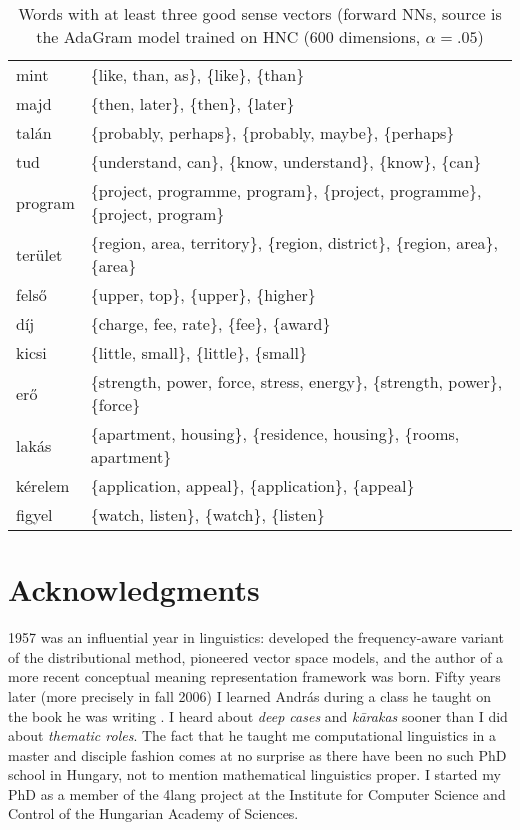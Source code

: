 \documentclass[11pt]{article}
\begin{document}
\begin{table*}[t]
  \begin{tabular}{ll}
    \toprule
    mint	& \{like, than, as\}, \{like\}, \{than\}	\\
    majd	& \{then, later\}, \{then\}, \{later\}	\\
    talán	& \{probably, perhaps\}, \{probably, maybe\}, \{perhaps\}	\\
    tud	& \{understand, can\}, \{know, understand\}, \{know\}, \{can\}	\\
    program	& \{project, programme, program\}, \{project, programme\}, \{project, program\}	\\
    terület	& \{region, area, territory\}, \{region, district\}, \{region, area\}, \{area\}	\\
    felső	& \{upper, top\}, \{upper\}, \{higher\}	\\
    díj	& \{charge, fee, rate\}, \{fee\}, \{award\}	\\
    kicsi	& \{little, small\}, \{little\}, \{small\}	\\
    erő	& \{strength, power, force, stress, energy\}, \{strength, power\}, \{force\}	\\
    lakás	& \{apartment, housing\}, \{residence, housing\}, \{rooms, apartment\}	\\
    kérelem	& \{application, appeal\}, \{application\}, \{appeal\}	\\
    figyel	& \{watch, listen\}, \{watch\}, \{listen\}	\\
    \bottomrule
  \end{tabular}
  \caption{Words with at least three good sense vectors (forward NNs, source is
  the AdaGram model trained on HNC (600 dimensions, $\alpha=.05$)}
  \label{tab:like_than}
\end{table*}

\section{Acknowledgments}

1957 was an influential year in linguistics: \cite{Harris:1957} developed the
frequency-aware variant of the distributional method, \cite{Osgood:1957}
pioneered vector space models, and the author of a more recent conceptual
meaning representation framework \citep{Kornai:2010,Kornai:2017} was born.
Fifty years later (more precisely in fall 2006) I learned András during a class
he taught on the book he was writing \citep{Kornai:2007}. I heard about
\emph{deep cases} and \emph{k\={a}rakas} sooner than I did about \emph{thematic
roles}. The fact that he taught me computational linguistics in a master and
disciple fashion comes at no surprise as there have been no such PhD school in
Hungary, not to mention mathematical linguistics proper.
I started my PhD as a member of the 4lang project at the Institute for Computer
Science and Control of the Hungarian Academy of Sciences.
\end{document}
